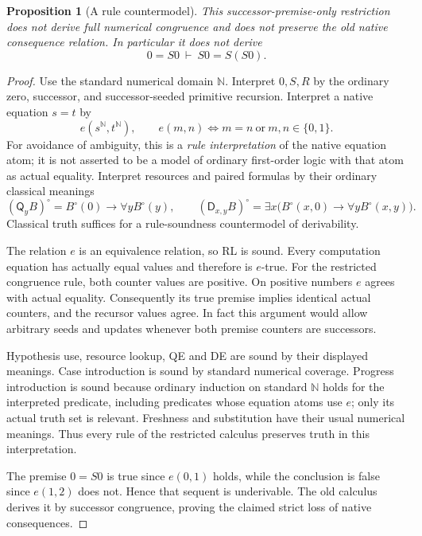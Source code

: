 \documentclass[11pt,letterpaper]{article}
\newtheorem{proposition}[theorem]{Proposition}
\theoremstyle{definition}\newtheorem{definition}[theorem]{Definition}
\theoremstyle{remark}\newtheorem{remark}[theorem]{Remark}
\begin{document}
\begin{proposition}[A rule countermodel]\label{zcc:countermodel}
This successor-premise-only restriction does not derive full numerical
congruence and does not preserve the old native consequence relation.
In particular it does not derive
\[
                         0=S0\ \vdash\ S0=S(S0).
\]
\end{proposition}
\begin{proof}
Use the standard numerical domain $\mathbb N$. Interpret $0,S,R$ by
the ordinary zero, successor, and successor-seeded primitive recursion.
Interpret a native equation $s=t$ by
\[
 e(s^{\mathbb N},t^{\mathbb N}),
 \qquad e(m,n)\iff m=n\ \text{or}\ m,n\in\{0,1\}.
\]
For avoidance of ambiguity, this is a \emph{rule interpretation} of the
native equation atom; it is not asserted to be a model of ordinary
first-order logic with that atom as actual equality. Interpret resources
and paired formulas by their ordinary classical meanings
\[
 (\mathsf Q_yB)^\circ=B^\circ(0)\to\forall yB^\circ(y),\qquad
 (\mathsf D_{x,y}B)^\circ=
 \exists x\bigl(B^\circ(x,0)\to\forall yB^\circ(x,y)\bigr).
\]
Classical truth suffices for a rule-soundness countermodel of derivability.

The relation $e$ is an equivalence relation, so RL is sound. Every
computation equation has actually equal values and therefore is $e$-true.
For the restricted congruence rule, both counter values are positive.
On positive numbers $e$ agrees with actual equality. Consequently its
true premise implies identical actual counters, and the recursor
values agree. In fact this argument would allow arbitrary seeds and
updates whenever both premise counters are successors.

Hypothesis use, resource lookup, QE and DE are sound by their displayed
meanings. Case introduction is sound by standard numerical coverage.
Progress introduction is sound because ordinary induction on standard
$\mathbb N$ holds for the interpreted predicate, including predicates
whose equation atoms use $e$; only its actual truth set is relevant.
Freshness and substitution have their usual numerical meanings.
Thus every rule of the restricted calculus preserves truth in this
interpretation.

The premise $0=S0$ is true since $e(0,1)$ holds, while the conclusion is
false since $e(1,2)$ does not. Hence that sequent is underivable. The old
calculus derives it by successor congruence, proving the claimed strict
loss of native consequences.
\end{proof}
\end{document}
